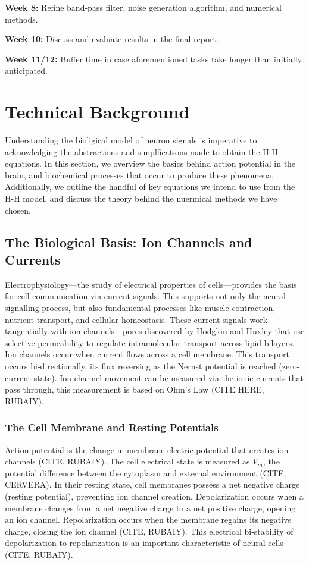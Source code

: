 \documentclass{article} %
\begin{document}
\begin{multicols}{2}
\textbf{Week 8: } Refine band-pass filter, noise generation algorithm, and numerical methods.

\textbf{Week 10: } Discuss and evaluate results in the final report.

\textbf{Week 11/12: } Buffer time in case aforementioned tasks take longer than initially anticipated.


\section{Technical Background}
\label{sec:technical_background}

Understanding the bioligical model of neuron signals is imperative to acknowledging the abstractions and simplfications made to obtain the H-H equations.
In this section, we overview the basics behind action potential in the brain, and biochemical processes that occur to produce these phenomena.
Additionally, we outline the handful of key equations we intend to use from the H-H model, and discuss the theory behind the nuermical methods we have chosen.

\subsection{The Biological Basis: Ion Channels and Currents}
\label{subsec:biological_basis}

Electrophysiology—the study of electrical properties of cells—provides the basis for cell communication via current signals. This supports not only the neural signalling process, but also fundamental processes like muscle contraction, nutrient transport, and cellular homeostasis. These current signals work tangentially with ion channels—pores discovered by Hodgkin and Huxley that use selective permeability to regulate intramolecular transport across lipid bilayers. Ion channels occur when current flows across a cell membrane. This transport occurs bi-directionally, its flux reversing as the Nernst potential is reached (zero-current state). Ion channel movement can be measured via the ionic currents that pass through, this measurement is based on Ohm's Law (CITE HERE, RUBAIY).

\subsubsection{The Cell Membrane and Resting Potentials}
\label{subsubsec:resting_potential}

Action potential is the change in membrane electric potential that creates ion channels (CITE, RUBAIY). The cell electrical state is measured as $V_{m}$, the potential difference between the cytoplasm and external environment (CITE, CERVERA). In their resting state, cell membranes possess a net negative charge (resting potential), preventing ion channel creation. Depolarization occurs when a membrane changes from a net negative charge to a net positive charge, opening an ion channel. Repolarization occurs when the membrane regains its negative charge, closing the ion channel (CITE, RUBAIY). This electrical bi-stability of depolarization to repolarization is an important characteristic of neural cells (CITE, RUBAIY).


\end{multicols}
\end{document}
